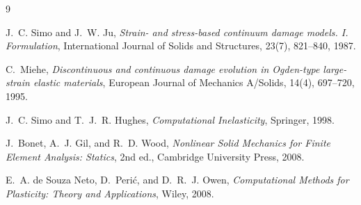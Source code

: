 \begin{thebibliography}{9}

J.~C. Simo and J.~W. Ju,
\emph{Strain- and stress-based continuum damage models. I. Formulation},
International Journal of Solids and Structures, 23(7), 821--840, 1987.

C.~Miehe,
\emph{Discontinuous and continuous damage evolution in Ogden-type large-strain
elastic materials},
European Journal of Mechanics A/Solids, 14(4), 697--720, 1995.

J.~C. Simo and T.~J.~R. Hughes,
\emph{Computational Inelasticity},
Springer, 1998.

J.~Bonet, A.~J. Gil, and R.~D. Wood,
\emph{Nonlinear Solid Mechanics for Finite Element Analysis: Statics},
2nd ed., Cambridge University Press, 2008.

E.~A. de Souza Neto, D.~Peri\'{c}, and D.~R.~J. Owen,
\emph{Computational Methods for Plasticity: Theory and Applications},
Wiley, 2008.

\end{thebibliography}
